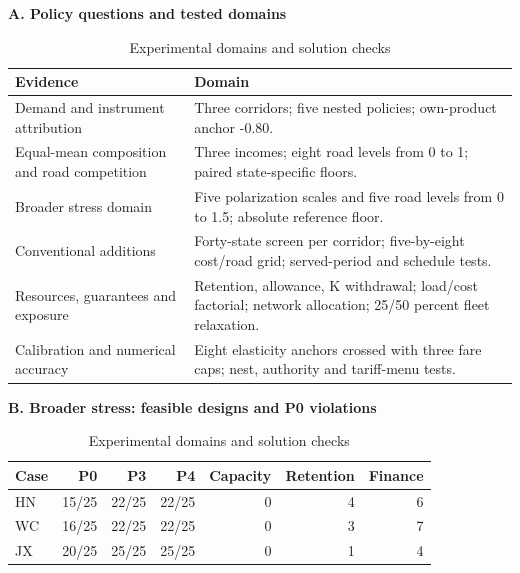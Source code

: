 \begin{table}[htbp]\centering
\caption{Experimental domains and solution checks}\label{tab:experiment_overview}
\begin{minipage}{.95\textwidth}\fontsize{8}{9.5}\selectfont{}\setlength{\tabcolsep}{2pt}\renewcommand{\arraystretch}{1.02}
\par\noindent\textbf{A. Policy questions and tested domains}\par\smallskip
\begin{tabular*}{\linewidth}{@{\extracolsep{\fill}}>{\raggedright\arraybackslash}p{.29\linewidth}>{\raggedright\arraybackslash}p{.65\linewidth}@{}}\toprule
Evidence & Domain \\
\midrule
Demand and instrument attribution & Three corridors; five nested policies; own-product anchor -0.80. \\
Equal-mean composition and road competition & Three incomes; eight road levels from 0 to 1; paired state-specific floors. \\
Broader stress domain & Five polarization scales and five road levels from 0 to 1.5; absolute reference floor. \\
Conventional additions & Forty-state screen per corridor; five-by-eight cost/road grid; served-period and schedule tests. \\
Resources, guarantees and exposure & Retention, allowance, K withdrawal; load/cost factorial; network allocation; 25/50 percent fleet relaxation. \\
Calibration and numerical accuracy & Eight elasticity anchors crossed with three fare caps; nest, authority and tariff-menu tests. \\
\bottomrule\end{tabular*}\par\medskip
\par\noindent\textbf{B. Broader stress: feasible designs and P0 violations}\par\smallskip
\begin{tabular*}{\linewidth}{@{\extracolsep{\fill}}lrrrrrr@{}}\toprule
Case & P0 & P3 & P4 & Capacity & Retention & Finance \\
\midrule
HN & 15/25 & 22/25 & 22/25 & 0 & 4 & 6 \\
WC & 16/25 & 22/25 & 22/25 & 0 & 3 & 7 \\
JX & 20/25 & 25/25 & 25/25 & 0 & 1 & 4 \\
\bottomrule\end{tabular*}\par\medskip

\end{minipage}
\end{table}
